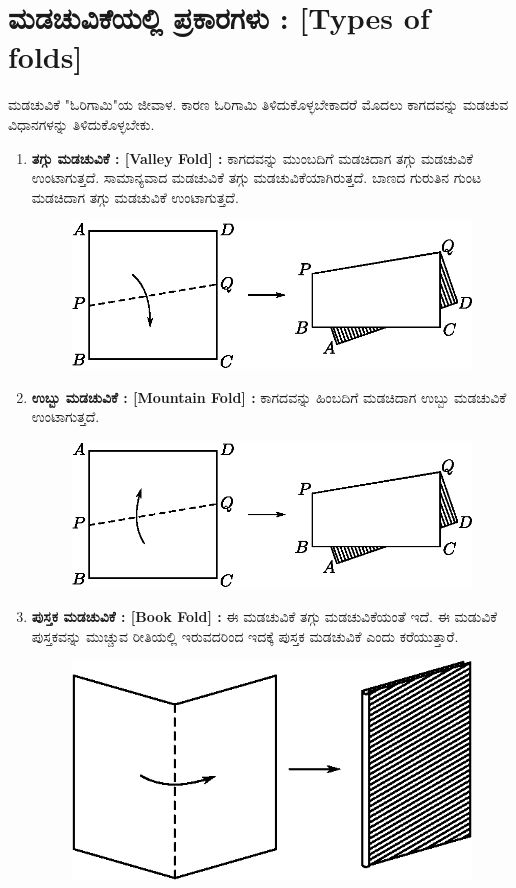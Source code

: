 \section{ಮಡಚುವಿಕೆಯಲ್ಲಿ ಪ್ರಕಾರಗಳು : [Types of folds]}\label{sec1.6}%
ಮಡಚುವಿಕೆ "ಓರಿಗಾಮಿ"ಯ ಜೀವಾಳ. ಕಾರಣ ಓರಿಗಾಮಿ ತಿಳಿದುಕೊಳ್ಳಬೇಕಾದರೆ ಮೊದಲು ಕಾಗದವನ್ನು ಮಡಚುವ ವಿಧಾನಗಳನ್ನು ತಿಳಿದುಕೊಳ್ಳಬೇಕು. 
\begin{enumerate}
\item \textbf{ತಗ್ಗು ಮಡಚುವಿಕೆ : [Valley Fold] :} ಕಾಗದವನ್ನು ಮುಂಬದಿಗೆ ಮಡಚಿದಾಗ ತಗ್ಗು ಮಡಚುವಿಕೆ ಉಂಟಾಗುತ್ತದೆ. ಸಾಮಾನ್ಯವಾದ ಮಡಚುವಿಕೆ ತಗ್ಗು ಮಡಚುವಿಕೆಯಾಗಿರುತ್ತದೆ. ಬಾಣದ ಗುರುತಿನ  ಗುಂಟ ಮಡಚಿದಾಗ ತಗ್ಗು ಮಡಚುವಿಕೆ ಉಂಟಾಗುತ್ತದೆ. 
\begin{figure}[H]
\centering
\includegraphics[scale=.98]{src/figure/chap1/fig1-1.eps}
\end{figure}

\item  \textbf{ಉಬ್ಬು ಮಡಚುವಿಕೆ : [Mountain Fold] :} ಕಾಗದವನ್ನು ಹಿಂಬದಿಗೆ ಮಡಚಿದಾಗ ಉಬ್ಬು ಮಡಚುವಿಕೆ ಉಂಟಾಗುತ್ತದೆ. 
\begin{figure}[H]
\centering
\includegraphics[scale=.98]{src/figure/chap1/fig1-2.eps}
\end{figure}


\item  \textbf{ಪುಸ್ತಕ ಮಡಚುವಿಕೆ : [Book Fold] :} 
ಈ ಮಡಚುವಿಕೆ ತಗ್ಗು ಮಡಚುವಿಕೆಯಂತೆ ಇದೆ. ಈ ಮಡುವಿಕೆ ಪುಸ್ತಕವನ್ನು ಮುಚ್ಚುವ ರೀತಿಯಲ್ಲಿ ಇರುವದರಿಂದ ಇದಕ್ಕೆ ಪುಸ್ತಕ ಮಡಚುವಿಕೆ ಎಂದು ಕರೆಯುತ್ತಾರೆ. 
\begin{figure}[H]
\centering
\includegraphics[scale=.98]{src/figure/chap1/fig1-3.eps}
\end{figure}



\end{enumerate}
